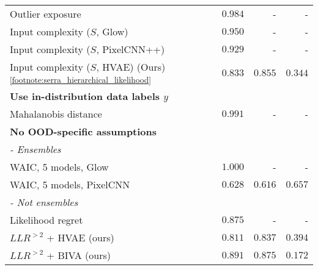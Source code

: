 {\begin{table}
{\begin{tabular}{lrrr}
Outlier exposure {\parencite{hendrycks_deep_2019}}                              & $0.984$ & - & - \\
Input complexity ($S$, Glow) \parencite{serra_input_2020}                   & $0.950$ & - & - \\
Input complexity ($S$, PixelCNN++) \parencite{serra_input_2020}             & $0.929$ & - & - \\
Input complexity ($S$, HVAE) (Ours) \parencite{serra_input_2020}\textsuperscript{\ref{footnote:serra_hierarchical_likelihood}} & $0.833$ & $0.855$ & $0.344$ \\
\multicolumn{4}{l}{\textbf{Use in-distribution data labels $y$}} \\
Mahalanobis distance {\parencite{lee_simple_2018}}                          & $0.991$ & - & -  \\
         \multicolumn{4}{l}{\textbf{No OOD-specific assumptions}} \\
         \multicolumn{4}{l}{\textit{- Ensembles}} \\
WAIC, 5 models, Glow {\parencite{choi_waic_2019}}                          & $1.000$ & - & - \\
WAIC, 5 models, PixelCNN {\parencite{ren_likelihood_2019}}                      & $0.628$ & $0.616$ & $0.657$ \\
         \multicolumn{4}{l}{\textit{- Not ensembles}} \\
Likelihood regret \parencite{xiao_likelihood_2020}                               & $0.875$ & - & - \\
$LLR^{>2}$ + HVAE (ours)                            & $0.811$ & $0.837$ & $0.394$ \\
$LLR^{>2}$ + BIVA (ours)                            & $\mathbf{0.891}$ & $\mathbf{0.875}$ & $\mathbf{0.172}$ \\
         \bottomrule
    \end{tabular}%
    }
    \label{tab_hierarchical:rocauc-ood}
\end{table}

\addtocounter{footnote}{1}



}
